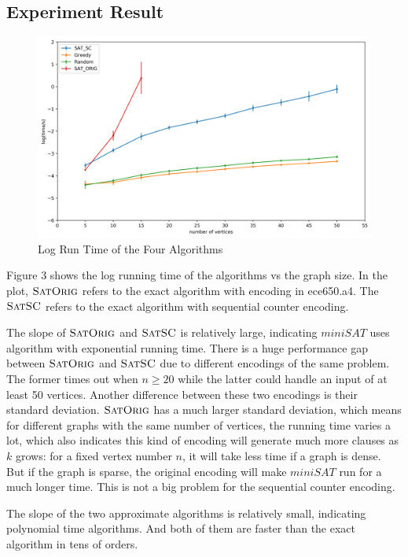 \documentclass[11pt]{article}
\begin{document}
\subsection{Experiment Result}
\begin{figure}[H]
\centerline{\includegraphics[width=13cm]{time_sc_slow.png}}
\caption{Log Run Time of the Four Algorithms}
\end{figure}
Figure 3 shows the log running time of the algorithms vs the graph size. In the plot, $\textsc{SatOrig}$ refers to the exact algorithm with encoding in ece650.a4. The $\textsc{SatSC}$ refers to the exact algorithm with sequential counter encoding. 

The slope of $\textsc{SatOrig}$ and $\textsc{SatSC}$ is relatively large, indicating $miniSAT$ uses algorithm with exponential running time. There is a huge performance gap between $\textsc{SatOrig}$ and $\textsc{SatSC}$ due to different encodings of the same problem. The former times out when $n \geq 20$ while the latter could handle an input of at least 50 vertices. Another difference between these two encodings is their standard deviation. $\textsc{SatOrig}$ has a much larger standard deviation, which means for different graphs with the same number of vertices, the running time varies a lot, which also indicates this kind of encoding will generate much more clauses as $k$ grows: for a fixed vertex number $n$, it will take less time if a graph is dense. But if the graph is sparse, the original encoding will make $miniSAT$ run for a much longer time. This is not a big problem for the sequential counter encoding.

The slope of the two approximate algorithms is relatively small, indicating polynomial time algorithms. And both of them are faster than the exact algorithm in tens of orders. 
\end{document}
